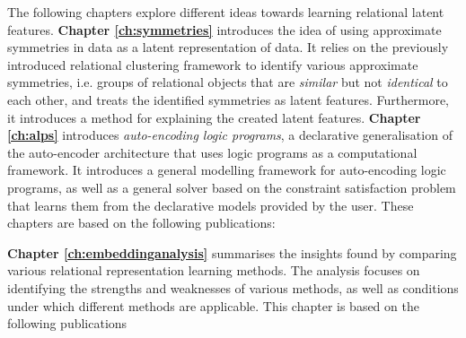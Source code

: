 The following chapters explore different ideas towards learning relational latent features.
\textbf{Chapter \ref{ch:symmetries}} introduces the idea of using approximate symmetries in data as a latent representation of data.
It relies on the previously introduced relational clustering framework to identify various approximate symmetries, i.e. groups of relational objects that are \textit{similar} but not \textit{identical} to each other, and treats the identified symmetries as latent features.
Furthermore, it introduces a method for explaining the created latent features.
\textbf{Chapter \ref{ch:alps}} introduces \textit{auto-encoding logic programs}, a declarative generalisation of the auto-encoder architecture \cite{Hinton504} that uses logic programs as a computational framework.
It introduces a general modelling framework for auto-encoding logic programs, as well as a general solver based on the constraint satisfaction problem that learns them from the declarative models provided by the user.
These chapters are based on the following publications:

\begin{quote}
\end{quote}

\begin{quote}
\end{quote}

\begin{quote}
\end{quote}

\begin{quote}
\end{quote}

\begin{quote}
\end{quote}


\textbf{Chapter \ref{ch:embeddinganalysis}} summarises the insights found by comparing various relational representation learning methods.
The analysis focuses on identifying the strengths and weaknesses of various methods, as well as conditions under which different methods are applicable.
This chapter is based on the following publications

\begin{quote}
\end{quote}

\begin{quote}
\end{quote}

